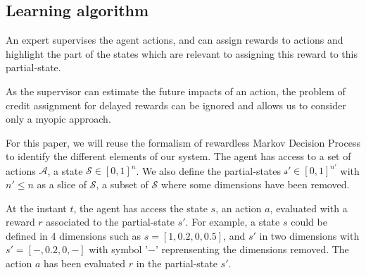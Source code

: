 \documentclass[letterpaper]{article} %
\begin{document}

\subsection{Learning algorithm}

An expert supervises the agent actions, and can assign rewards to actions and
highlight the part of the states which are relevant to assigning this reward to
this partial-state.

As the supervisor can estimate the future impacts of an action, the problem of
credit assignment for delayed rewards can be ignored  and allows us to consider
only a myopic approach. 

For this paper, we will reuse the formalism of rewardless Markov Decision 
Process to identify the different elements of our system. The agent has access
to a set of actions $\mathcal{A}$, a state $\mathcal{S} \in [0,1]^{n}$. We
also define the partial-states $\mathcal{s'} \in [0,1]^{n'}$ with $n' \leq n$ as a
slice of $\mathcal{S}$, a subset of $\mathcal{S}$ where some dimensions have
been removed. 

At the instant $t$, the agent has access the state $s$, an action $a$, evaluated
with a reward $r$ associated to the partial-state $s'$. For example, a state $s$ could be
defined in 4 dimensions such as ${s=[1,0.2,0,0.5]}$, and $s'$ in two dimensions with
${s'=[-,0.2,0,-]}$ with symbol '$-$' reprensenting the dimensions removed. The
action $a$ has been evaluated $r$ in the partial-state $s'$. 
\end{document}
